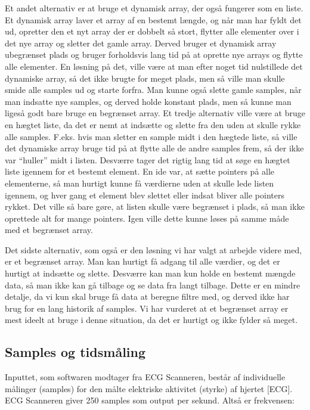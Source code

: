 \documentclass{article}
\begin{document}
Et andet alternativ er at bruge et dynamisk array, der også fungerer som en liste. Et dynamisk array laver et array af en bestemt længde, og når man har fyldt det ud, opretter den et nyt array der er dobbelt så stort, flytter alle elementer over i det nye array og sletter det gamle array. Derved bruger et dynamisk array ubegrænset plads og bruger forholdsvis lang tid på at oprette nye arrays og flytte alle elementer. En løsning på det, ville være at man efter noget tid nulstillede det dynamiske array, så det ikke brugte for meget plads, men så ville man skulle smide alle samples ud og starte forfra. Man kunne også slette gamle samples, når man indsatte nye samples, og derved holde konstant plads, men så kunne man ligeså godt bare bruge en begrænset array.
Et tredje alternativ ville være at bruge en hægtet liste, da det er nemt at indsætte og slette fra den uden at skulle rykke alle samples. F.eks. hvis man sletter en sample midt i den hægtede liste, så ville det dynamiske array bruge tid på at flytte alle de andre samples frem, så der ikke var “huller” midt i listen. Desværre tager det rigtig lang tid at søge en hægtet liste igennem for et bestemt element. En ide var, at sætte pointers på alle elementerne, så man hurtigt kunne få værdierne uden at skulle lede listen igennem, og hver gang et element blev slettet eller indsat bliver alle pointers rykket. Det ville så bare gøre, at listen skulle være begrænset i plads, så man ikke oprettede alt for mange pointers. Igen ville dette kunne løses på samme måde med et begrænset array.

Det sidste alternativ, som også er den løsning vi har valgt at arbejde videre med, er et begrænset array. Man kan hurtigt få adgang til alle værdier, og det er hurtigt at indsætte og slette. Desværre kan man kun holde en bestemt mængde data, så man ikke kan gå tilbage og se data fra langt tilbage. Dette er en mindre detalje, da vi kun skal bruge få data at beregne filtre med, og derved ikke har brug for en lang historik af samples. 
Vi har vurderet at et begrænset array er mest ideelt at bruge i denne situation, da det er hurtigt og ikke fylder så meget.

\subsection{Samples og tidsmåling}
Inputtet, som softwaren modtager fra ECG Scanneren, består af individuelle målinger (samples) for den målte elektriske aktivitet (styrke) af hjertet [ECG]. ECG Scanneren giver 250 samples som output per sekund. Altså er frekvensen:
\end{document}
